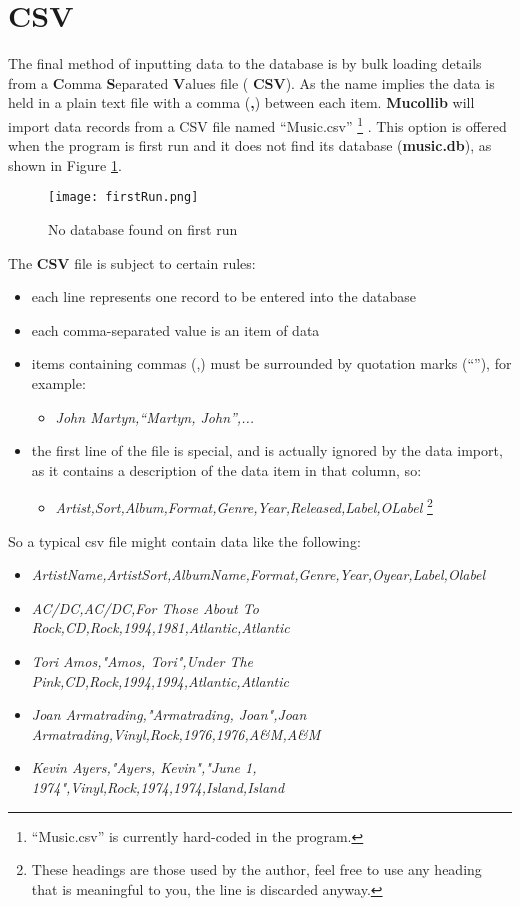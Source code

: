 \section{CSV}
\label{sect:csv}
The final method of inputting data to the database is by bulk loading details from a
\textbf{C}omma 
\textbf{S}eparated
\textbf{V}alues
file (
\textbf{CSV}).
As the name implies the data is held in a plain text file with a comma
(\textbf{,})
between each item.
\textbf{Mucollib}
will import data records from a CSV file named ``Music.csv''
\footnote{``Music.csv'' is currently hard-coded in the program.}
.  This option is offered when the program is first run and it does not find its database
(\textbf{music.db}), 
as shown in Figure 
\ref{fig:No database found}.
\begin{figure}[!ht]
  \texttt{[image: firstRun.png]}
  \caption{No database found on first run}
  \label{fig:No database found}
\end{figure}
\newpage
The \textbf{CSV} file is subject to certain rules:
\begin{itemize}
\item each line represents one record to be entered into the database
\item each comma-separated value is an item of data
\item items containing commas (,) must be surrounded by quotation marks (``''), for example:
\begin{itemize}
\item \textit{John Martyn,``Martyn, John'',...}
\end{itemize}
\item the first line of the file is special, and is actually ignored by the data import, as it contains a description of the data item in that column, so:
\begin{itemize}
\item \textit{Artist,Sort,Album,Format,Genre,Year,Released,Label,OLabel}
\footnote{These headings are those used by the author, feel free to use any heading that is meaningful to you, the line is discarded anyway.}
\end{itemize}
\end{itemize}

So a typical csv file might contain data like the following:
\begingroup
\fontsize{8pt}{8pt}
\begin{itemize}
\item \textit{ArtistName,ArtistSort,AlbumName,Format,Genre,Year,Oyear,Label,Olabel}
\item \textit{AC/DC,AC/DC,For Those About To Rock,CD,Rock,1994,1981,Atlantic,Atlantic}
\item \textit{Tori Amos,"Amos, Tori",Under The Pink,CD,Rock,1994,1994,Atlantic,Atlantic}
\item \textit{Joan Armatrading,"Armatrading, Joan",Joan Armatrading,Vinyl,Rock,1976,1976,A\&M,A\&M}
\item \textit{Kevin Ayers,"Ayers, Kevin","June 1, 1974",Vinyl,Rock,1974,1974,Island,Island}
\end{itemize}
\endgroup
